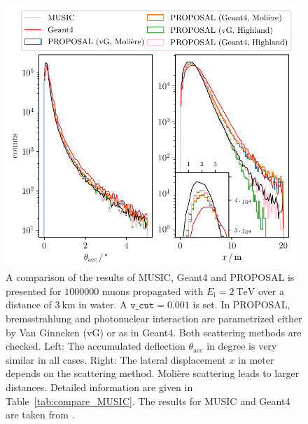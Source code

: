 \documentclass[pdflatex, sn-mathphys]{sn-jnl}%
\theoremstyle{thmstyleone}%
\theoremstyle{thmstyletwo}%
\theoremstyle{thmstylethree}%
\begin{document}
\begin{figure}
    \centering 
    \includegraphics[width=0.98\textwidth]{../../deflection/plots/FINAL/2TeV_1e6events_accumulated_defl_paper_combined_zoom.pdf}
    \caption{A comparison of the results of MUSIC, Geant4 and PROPOSAL is presented for $\num{1000000}$ muons propagated with 
    $E_{\text{i}} = \SI{2}{\tera\electronvolt}$ over a distance of 
    $\SI{3}{\kilo\meter}$ in water. A $\texttt{v\_cut} = 0.001$ is set. In PROPOSAL, 
    bremsstrahlung and photonuclear interaction are parametrized either by 
    Van Ginneken (vG) or as in Geant4. Both scattering methods are checked. 
    Left: The accumulated deflection $\theta_{\mathrm{acc}}$ in degree is very similar in all cases.
    Right: The lateral displacement $x$ in meter depends 
    on the scattering method. Molière scattering leads to larger distances.
    Detailed information are given in 
    Table~\ref{tab:compare_MUSIC}. The results for MUSIC and Geant4 are taken from 
    \cite{comparison_MUSIC_GEANT4_2009}.}
    \label{fig:compare_MUSIC}
\end{figure}
\end{document}
